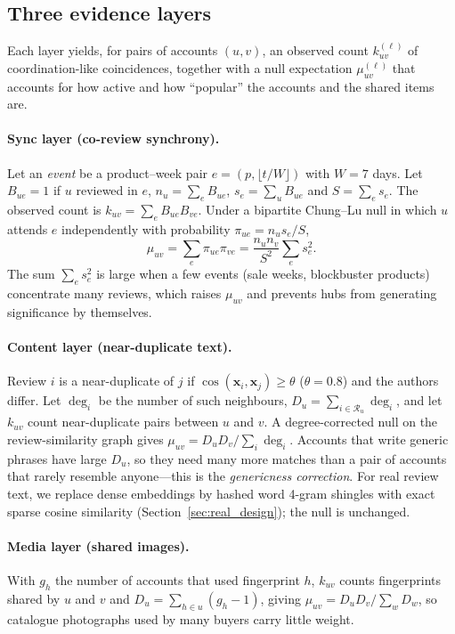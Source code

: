 \documentclass[pdflatex,sn-basic]{sn-jnl}
\theoremstyle{thmstyleone}
\theoremstyle{thmstylethree}
\begin{document}
\subsection{Three evidence layers}\label{sec:layers}

Each layer yields, for pairs of accounts $(u,v)$, an observed count $k^{(\ell)}_{uv}$ of coordination-like coincidences, together with a null expectation $\mu^{(\ell)}_{uv}$ that accounts for how active and how ``popular'' the accounts and the shared items are.

\paragraph{Sync layer (co-review synchrony).} Let an \emph{event} be a product--week pair $e=(p,\lfloor t/W\rfloor)$ with $W=7$ days. Let $B_{ue}=1$ if $u$ reviewed in $e$, $n_u=\sum_eB_{ue}$, $s_e=\sum_uB_{ue}$ and $S=\sum_es_e$. The observed count is $k_{uv}=\sum_eB_{ue}B_{ve}$. Under a bipartite Chung--Lu null in which $u$ attends $e$ independently with probability $\pi_{ue}=n_us_e/S$,
\begin{equation}\label{eq:mu}
\mu_{uv}=\sum_e\pi_{ue}\pi_{ve}=\frac{n_un_v}{S^{2}}\sum_e s_e^{2}.
\end{equation}
The sum $\sum_es_e^2$ is large when a few events (sale weeks, blockbuster products) concentrate many reviews, which raises $\mu_{uv}$ and prevents hubs from generating significance by themselves.

\paragraph{Content layer (near-duplicate text).} Review $i$ is a near-duplicate of $j$ if $\cos(\mathbf x_i,\mathbf x_j)\ge\theta$ ($\theta=0.8$) and the authors differ. Let $\deg_i$ be the number of such neighbours, $D_u=\sum_{i\in\mathcal R_u}\deg_i$, and let $k_{uv}$ count near-duplicate pairs between $u$ and $v$. A degree-corrected null on the review-similarity graph gives $\mu_{uv}=D_uD_v/\sum_i\deg_i$. Accounts that write generic phrases have large $D_u$, so they need many more matches than a pair of accounts that rarely resemble anyone---this is the \emph{genericness correction}. For real review text, we replace dense embeddings by hashed word 4-gram shingles with exact sparse cosine similarity (Section~\ref{sec:real_design}); the null is unchanged.

\paragraph{Media layer (shared images).} With $g_h$ the number of accounts that used fingerprint $h$, $k_{uv}$ counts fingerprints shared by $u$ and $v$ and $D_u=\sum_{h\in u}(g_h-1)$, giving $\mu_{uv}=D_uD_v/\sum_wD_w$, so catalogue photographs used by many buyers carry little weight.
\end{document}
